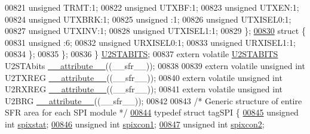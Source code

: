 \begin{DoxyCode}
00821       \textcolor{keywordtype}{unsigned} TRMT:1;
00822       \textcolor{keywordtype}{unsigned} UTXBF:1;
00823       \textcolor{keywordtype}{unsigned} UTXEN:1;
00824       \textcolor{keywordtype}{unsigned} UTXBRK:1;
00825       \textcolor{keywordtype}{unsigned} :1;
00826       \textcolor{keywordtype}{unsigned} UTXISEL0:1;
00827       \textcolor{keywordtype}{unsigned} UTXINV:1;
00828       \textcolor{keywordtype}{unsigned} UTXISEL1:1;
00829     \};
\hypertarget{a00015_source_l00830}{}\hyperlink{a00015}{00830}     \textcolor{keyword}{struct }\{
00831       \textcolor{keywordtype}{unsigned} :6;
00832       \textcolor{keywordtype}{unsigned} URXISEL0:1;
00833       \textcolor{keywordtype}{unsigned} URXISEL1:1;
00834     \};
00835   \};
00836 \} \hyperlink{a00014_d3/d69/a00844}{U2STABITS};
00837 \textcolor{keyword}{extern} \textcolor{keyword}{volatile} \hyperlink{a00014_d3/d69/a00844}{U2STABITS} U2STAbits \hyperlink{a00015_a493c46f03454991ccc5aa7a6e1dfb2a7}{\_\_attribute\_\_}((\_\_sfr\_\_));
00838 
00839 \textcolor{keyword}{extern} \textcolor{keyword}{volatile} \textcolor{keywordtype}{unsigned} \textcolor{keywordtype}{int}  U2TXREG \hyperlink{a00015_a493c46f03454991ccc5aa7a6e1dfb2a7}{\_\_attribute\_\_}((\_\_sfr\_\_));
00840 \textcolor{keyword}{extern} \textcolor{keyword}{volatile} \textcolor{keywordtype}{unsigned} \textcolor{keywordtype}{int}  U2RXREG \hyperlink{a00015_a493c46f03454991ccc5aa7a6e1dfb2a7}{\_\_attribute\_\_}((\_\_sfr\_\_));
00841 \textcolor{keyword}{extern} \textcolor{keyword}{volatile} \textcolor{keywordtype}{unsigned} \textcolor{keywordtype}{int}  U2BRG \hyperlink{a00015_a493c46f03454991ccc5aa7a6e1dfb2a7}{\_\_attribute\_\_}((\_\_sfr\_\_));
00842 
00843 \textcolor{comment}{/* Generic structure of entire SFR area for each SPI module */}
\hypertarget{a00015_source_l00844}{}\hyperlink{a00014}{00844} \textcolor{keyword}{typedef} \textcolor{keyword}{struct }tagSPI \{
\hypertarget{a00015_source_l00845}{}\hyperlink{a00014_abef89a15a5da0a184b4f3c8605131827}{00845}         \textcolor{keywordtype}{unsigned} \textcolor{keywordtype}{int} \hyperlink{a00014_abef89a15a5da0a184b4f3c8605131827}{spixstat};
\hypertarget{a00015_source_l00846}{}\hyperlink{a00014_a91ad3051fa8851d3a39f5178b40b6ca5}{00846}         \textcolor{keywordtype}{unsigned} \textcolor{keywordtype}{int} \hyperlink{a00014_a91ad3051fa8851d3a39f5178b40b6ca5}{spixcon1};
\hypertarget{a00015_source_l00847}{}\hyperlink{a00014_a2e1664d721667038d3117ae858fc85c4}{00847}         \textcolor{keywordtype}{unsigned} \textcolor{keywordtype}{int} \hyperlink{a00014_a2e1664d721667038d3117ae858fc85c4}{spixcon2};

\end{DoxyCode}
